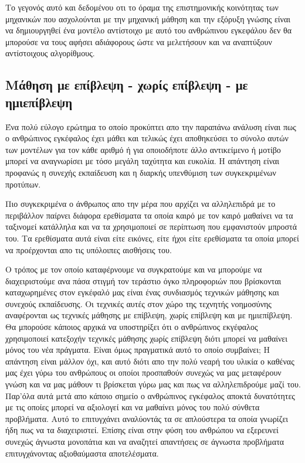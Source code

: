 \par Το γεγονός αυτό και δεδομένου οτι το όραμα της επιστημονικής κοινότητας των μηχανικών που ασχολούνται με την μηχανική μάθηση και την εξόρυξη γνώσης είναι να δημιουργηθεί ένα μοντέλο αντίστοιχο με αυτό του ανθρώπινου εγκεφάλου δεν θα μπορούσε να τους αφήσει αδιάφορους ώστε να μελετήσουν και να αναπτύξουν αντίστοιχους αλγορίθμους.

\subsection{Μάθηση με επίβλεψη - χωρίς επίβλεψη - με ημιεπίβλεψη}
\par
Ένα πολύ εύλογο ερώτημα το οποίο προκύπτει απο την παραπάνω ανάλυση είναι πως ο ανθρώπινος εγκέφαλος έχει μάθει και τελικώς έχει αποθηκεύσει το σύνολο αυτών των μοντέλων για τον κάθε αριθμό ή για οποιοδήποτε άλλο αντικείμενο ή μοτίβο μπορεί να αναγνωρίσει με τόσο μεγάλη ταχύτητα και ευκολία. Η απάντηση είναι προφανώς η συνεχής εκπαίδευση και η διαρκής υπενθύμιση των συγκεκριμένων προτύπων.
\par
Πιο συγκεκριμένα ο άνθρωπος απο την μέρα που αρχίζει να αλληλεπιδρά με το περιβάλλον παίρνει διάφορα ερεθίσματα τα οποία καιρό με τον καιρό μαθαίνει να τα ταξινομεί κατάλληλα και να τα χρησιμοποιεί σε περίπτωση που εμφανιστούν μπροστά του. Τα ερεθίσματα αυτά είναι είτε εικόνες, είτε ήχοι είτε ερεθίσματα τα οποία μπορεί να προέρχονται απο τις υπόλοιπες αισθήσεις του.
\par
Ο τρόπος με τον οποίο καταφέρνουμε να συγκρατούμε και να μπορούμε να διαχειριστούμε ανα πάσα στιγμή τον τεράστιο όγκο πληροφοριών που βρίσκονται καταχωρημένες στον εγκέφαλό μας είναι ένας συνδιασμός τεχνικών μάθησης και συνεχούς εκπαίδευσης. Οι τεχνικές αυτές στον χώρο της τεχνητής νοημοσύνης αναφέρονται ως τεχνικές μάθησης με επίβλεψη, χωρίς επίβλεψη και με ημιεπίβλεψη. Θα μπορούσε κάποιος αρχικά να υποστηρίξει ότι ο ανθρώπινος εκγέφαλος χρησιμοποιεί κατεξοχήν τεχνικές μάθησης χωρίς επίβλεψη διότι μπορεί να μαθαίνει μόνος του νέα πράγματα. Είναι όμως πραγματικά αυτό το οποίο συμβαίνει; Η απάντηση είναι μάλλον όχι, και αυτό διότι απο την πολύ νεαρή του υλικία ο καθένας μας έχει γύρω του ανθρώπους οι οποίοι προσπαθούν συνεχώς να μας μεταφέρουν γνώση και να μας μάθουν τι βρίσκεται γύρω μας και πως να αλληλεπιδρούμε μαζί του. Παρ'όλα αυτά μετά απο κάποιο σημείο ο ανθρώπινος εγκέφαλος αποκτά δυνατότητες με τις οποίες μπορεί να αξιολογεί και να μαθαίνει μόνος του πολύ σύνθετα προβλήματα. Αυτό το επιτυγχάνει αναλύοντάς τα σε απλούστερα τα οποία γνωρίζει ήδη πως να τα διαχειριστεί. Επίσης είναι στην φύση του ανθρώπου να εξερευνεί συνεχώς άγνωστα μονοπάτια και να αναζητεί απαντήσεις σε άγνωστα προβλήματα επιτυγχάνοντας αξιοθαύμαστα αποτελέσματα.
